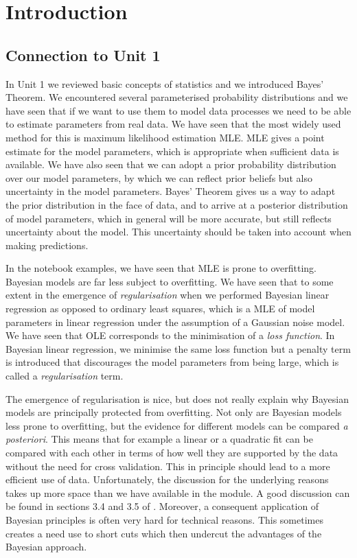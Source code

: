 
\chapter{Introduction}

\section{Connection to Unit 1}
In Unit 1 we reviewed basic concepts of statistics and we introduced
Bayes' Theorem. We  encountered several parameterised probability distributions
and we have seen that if we want to use them to model data processes we
need to be able to estimate parameters from real data. We have seen
that the most widely used method for this is maximum likelihood estimation
MLE. MLE gives a point estimate for the model parameters, which is appropriate
when sufficient data is available. We have also seen that we can adopt a prior
probability distribution over our model parameters, by which we can reflect prior beliefs but also uncertainty
in the model parameters. Bayes' Theorem gives us a way to adapt the prior distribution in the face
of data, and to arrive at a posterior distribution of model parameters, which in general will be more
accurate, but still reflects uncertainty about the model. This uncertainty should be taken into account when
making predictions.

In the notebook examples, we have seen that MLE is prone to overfitting. Bayesian models are
far less subject to overfitting. We have seen that to some extent in the emergence of \emph{regularisation}
when we performed Bayesian linear regression as opposed to ordinary least squares, which is a MLE of
model parameters in linear regression under the assumption of a Gaussian noise model. We have seen that OLE corresponds
to the minimisation of a \emph{loss function}. In Bayesian linear regression, we minimise the same loss function
but a penalty term is introduced that discourages the model parameters from  being large, which is called
a \emph{regularisation} term.

The emergence of regularisation is nice, but does not really explain why Bayesian models are
principally protected from overfitting. Not only are Bayesian models less prone to overfitting, but the evidence
for different models can be compared \emph{a posteriori}. This means that for example a linear or a quadratic fit
can be compared with each other in terms of how well they are supported by the data without the need for
cross validation. This in principle should lead to a more efficient
use of data. Unfortunately, the discussion for the underlying reasons takes up
more space than we have available in the module. A good discussion can be found in sections 3.4
and 3.5 of \cite{bishop2006}. Moreover, a consequent application of Bayesian principles is often very
hard for technical reasons. This sometimes creates a need use to short cuts which then undercut the
advantages of the Bayesian approach.

